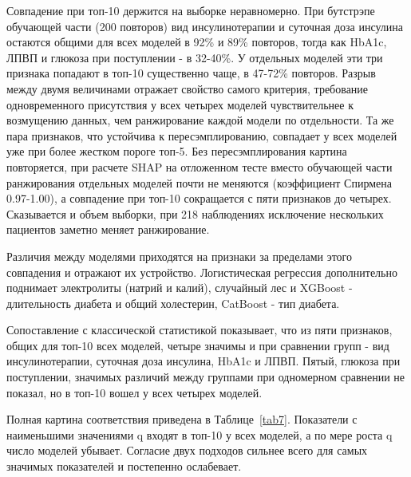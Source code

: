 \documentclass[pdflatex,sn-basic,Numbered]{sn-jnl}
\begin{document}
Совпадение при топ-10 держится на выборке неравномерно. При бутстрэпе обучающей части (200 повторов) вид инсулинотерапии и суточная доза инсулина остаются общими для всех моделей в 92\% и 89\% повторов, тогда как HbA1c, ЛПВП и глюкоза при поступлении - в 32-40\%. У отдельных моделей эти три признака попадают в топ-10 существенно чаще, в 47-72\% повторов. Разрыв между двумя величинами отражает свойство самого критерия, требование одновременного присутствия у всех четырех моделей чувствительнее к возмущению данных, чем ранжирование каждой модели по отдельности. Та же пара признаков, что устойчива к пересэмплированию, совпадает у всех моделей уже при более жестком пороге топ-5. Без пересэмплирования картина повторяется, при расчете SHAP на отложенном тесте вместо обучающей части ранжирования отдельных моделей почти не меняются (коэффициент Спирмена 0.97-1.00), а совпадение при топ-10 сокращается с пяти признаков до четырех. Сказывается и объем выборки, при 218 наблюдениях исключение нескольких пациентов заметно меняет ранжирование.

Различия между моделями приходятся на признаки за пределами этого совпадения и отражают их устройство. Логистическая регрессия дополнительно поднимает электролиты (натрий и калий), случайный лес и XGBoost - длительность диабета и общий холестерин, CatBoost - тип диабета.

Сопоставление с классической статистикой показывает, что из пяти признаков, общих для топ-10 всех моделей, четыре значимы и при сравнении групп - вид инсулинотерапии, суточная доза инсулина, HbA1c и ЛПВП. Пятый, глюкоза при поступлении, значимых различий между группами при одномерном сравнении не показал, но в топ-10 вошел у всех четырех моделей.

Полная картина соответствия приведена в Таблице~\ref{tab7}. Показатели с наименьшими значениями q входят в топ-10 у всех моделей, а по мере роста q число моделей убывает. Согласие двух подходов сильнее всего для самых значимых показателей и постепенно ослабевает.
\end{document}
